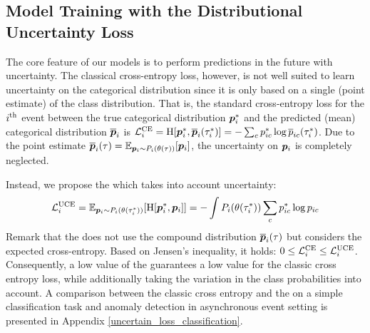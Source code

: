 \subsection{Model Training with the Distributional Uncertainty Loss}
\label{uncertainty_loss}

The core feature of our models is to perform predictions in the future with uncertainty.
The classical cross-entropy loss, however, is not well suited to learn uncertainty on the categorical distribution since it is only based on a single (point estimate) of the class distribution. That is, the standard cross-entropy loss for the $i^{\text{th}}$ event between the true categorical distribution $\bm{p}_{i}^{*}$ and the predicted (mean) categorical distribution $\overline{\bm{p}}_{i}$ is
$\mathcal{L}_{i}^{\text{CE}} = \operatorname{H}[\bm{p}_{i}^*, \overline{\bm{p}}_{i}(\tau_{i}^*)] = - \sum_c p_{i c}^* \log \overline{p}_{i c}(\tau_{i}^*)$. Due to the point estimate $\overline{\bm{p}}_{i}(\tau) = \operatorname{\mathbb{E}}_{\bm{p}_{i} \sim P_{i}(\theta(\tau))}[\bm{p}_{i}]$, the uncertainty on $\bm{p}_{i}$ is completely neglected.


Instead, we propose the \UncertaintyLoss which takes into account uncertainty:
\begin{equation}\label{eq:loss}
\begin{aligned}
\mathcal{L}_{i}^{\text{UCE}} = \operatorname{\mathbb{E}}_{\bm{p}_{i} \sim P_{i}(\theta(\tau_{i}^*))}[\operatorname{H}[\bm{p}_{i}^*, \bm{p}_{i}]] = - \int P_{i}(\theta(\tau_{i}^*)) \sum_c p_{i c}^* \log p_{i c}
\end{aligned}
\end{equation}
Remark that the \UncertaintyLoss does not
use the compound distribution $\overline{\bm{p}}_{i}(\tau)$ but considers the expected cross-entropy. Based on Jensen's inequality, it holds: $0 \leq \mathcal{L}_{i}^{\text{CE}} \leq \mathcal{L}_{i}^{\text{UCE}}
$. Consequently, a low value of the \UncertaintyLoss guarantees a low value for the classic cross entropy loss, while additionally taking the variation in the class probabilities into account. A comparison between the classic cross entropy and the \UncertaintyLoss on a simple classification task and anomaly detection in asynchronous event setting is presented in Appendix \ref{uncertain_loss_classification}.

